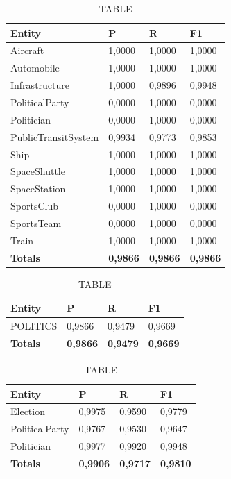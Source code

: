 \documentclass[thesis=M,english]{FITthesis}[2018/05/30]
\begin{document}
	\begin{table}[H]\centering
		\caption{TABLE}
		\label{}
		\begin{tabular}{|l|l|l|l|}
			\hline {\textbf{Entity}} & {\textbf{P}} & {\textbf{R}} & {\textbf{F1}}\\\hline
				Aircraft & 1,0000 & 1,0000 & 1,0000\\
				Automobile & 1,0000 & 1,0000 & 1,0000\\				
				Infrastructure & 1,0000 & 0,9896 & 0,9948\\
				PoliticalParty & 0,0000 & 1,0000 & 0,0000\\				
				Politician & 0,0000 & 1,0000 & 0,0000\\				
				PublicTransitSystem & 0,9934 & 0,9773 & 0,9853\\
				Ship & 1,0000 & 1,0000 & 1,0000\\				
				SpaceShuttle & 1,0000 & 1,0000 & 1,0000\\
				SpaceStation & 1,0000 & 1,0000 & 1,0000\\
				SportsClub & 0,0000 & 1,0000 & 0,0000\\
				SportsTeam & 0,0000 & 1,0000 & 0,0000\\
				Train & 1,0000 & 1,0000 & 1,0000\\\hline
				\textbf{Totals} & \textbf{0,9866} & \textbf{0,9866} & \textbf{0,9866}\\\hline
		\end{tabular}
	\end{table}		
	

	\begin{table}[H]\centering
		\caption{TABLE}
		\label{}
		\begin{tabular}{|l|l|l|l|}
			\hline {\textbf{Entity}} & {\textbf{P}} & {\textbf{R}} & {\textbf{F1}}\\\hline
				POLITICS & 0,9866 & 0,9479 & 0,9669\\\hline
				\textbf{Totals} & \textbf{0,9866} & \textbf{0,9479} & \textbf{0,9669}\\\hline
		\end{tabular}
	\end{table}

	\begin{table}[H]\centering
		\caption{TABLE}
		\label{}
		\begin{tabular}{|l|l|l|l|}
			\hline {\textbf{Entity}} & {\textbf{P}} & {\textbf{R}} & {\textbf{F1}}\\\hline
				Election & 0,9975 & 0,9590 & 0,9779\\
				PoliticalParty & 0,9767 & 0,9530 & 0,9647\\
				Politician & 0,9977 & 0,9920 & 0,9948\\\hline
				\textbf{Totals} & \textbf{0,9906} & \textbf{0,9717} & \textbf{0,9810}\\\hline
		\end{tabular}
	\end{table}	
	
\end{document}
